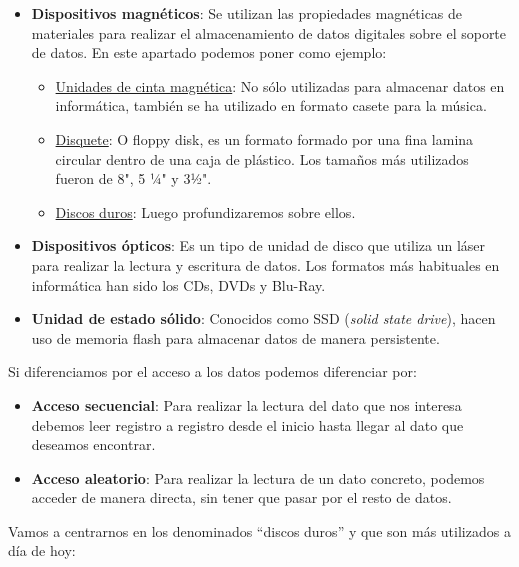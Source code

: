 \begin{itemize}
    \item \textbf{Dispositivos magnéticos}: Se utilizan las propiedades magnéticas de materiales para realizar el almacenamiento de datos digitales sobre el soporte de datos. En este apartado podemos poner como ejemplo:
    \begin{itemize}
        \item \href{https://es.wikipedia.org/wiki/Cinta_magn%C3%A9tica_de_almacenamiento_de_datos}{Unidades de cinta magnética}: No sólo utilizadas para almacenar datos en informática, también se ha utilizado en formato casete para la música.
        \hypertarget{disquete}{}
        \item \href{https://es.wikipedia.org/wiki/Disquete}{Disquete}: O floppy disk, es un formato formado por una fina lamina circular dentro de una caja de plástico. Los tamaños más utilizados fueron de 8", 5 ¼" y 3½".
        \item \href{https://es.wikipedia.org/wiki/Unidad_de_disco_duro}{Discos duros}: Luego profundizaremos sobre ellos.
    \end{itemize}

    \item \textbf{Dispositivos ópticos}: Es un tipo de unidad de disco que utiliza un láser para realizar la lectura y escritura de datos. Los formatos más habituales en informática han sido los CDs, DVDs y Blu-Ray.

    \item \textbf{Unidad de estado sólido}: Conocidos como SSD (\textit{solid state drive}), hacen uso de memoria flash para almacenar datos de manera persistente.
\end{itemize}


Si diferenciamos por el acceso a los datos podemos diferenciar por:

\begin{itemize}
    \item \textbf{Acceso secuencial}: Para realizar la lectura del dato que nos interesa debemos leer registro a registro desde el inicio hasta llegar al dato que deseamos encontrar.

    \item \textbf{Acceso aleatorio}: Para realizar la lectura de un dato concreto, podemos acceder de manera directa, sin tener que pasar por el resto de datos.
\end{itemize}

Vamos a centrarnos en los denominados “discos duros” y que son  más utilizados a día de hoy:

